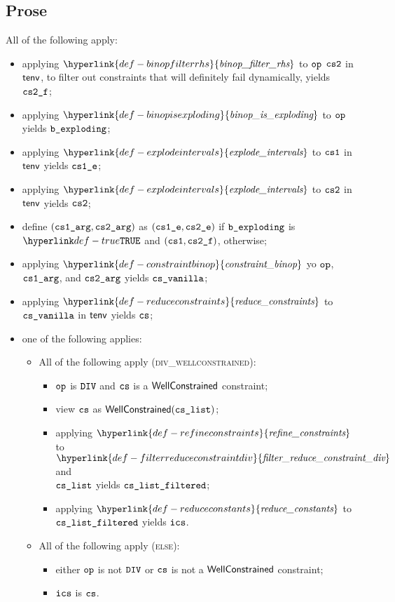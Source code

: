 \documentclass{book}
\newcommand\constraintbinop[0]{\hyperlink{def-constraintbinop}{\textfunc{constraint\_binop}}}
\newcommand\explodeintervals[0]{\hyperlink{def-explodeintervals}{\textfunc{explode\_intervals}}}
\newcommand\binopisexploding[0]{\hyperlink{def-binopisexploding}{\textfunc{binop\_is\_exploding}}}
\newcommand\binopfilterrhs[0]{\hyperlink{def-binopfilterrhs}{\textfunc{binop\_filter\_rhs}}}
\newcommand\refineconstraints[0]{\hyperlink{def-refineconstraints}{\textfunc{refine\_constraints}}}
\newcommand\filterreduceconstraintdiv[0]{\hyperlink{def-filterreduceconstraintdiv}{\textfunc{filter\_reduce\_constraint\_div}}}
\newcommand\reduceconstants[0]{\hyperlink{def-reduceconstants}{\textfunc{reduce\_constants}}}
\newcommand\reduceconstraints[0]{\hyperlink{def-reduceconstraints}{\textfunc{reduce\_constraints}}}
\begin{document}
\subsection{Prose}
All of the following apply:
\begin{itemize}
  \item applying $\binopfilterrhs$ to $\texttt{op}$ $\texttt{cs2}$ in $\textsf{tenv}$, to filter out constraints that will definitely fail dynamically, yields $\texttt{cs2\_f}$;
  \item applying $\binopisexploding$ to $\texttt{op}$ yields $\texttt{b\_exploding}$;
  \item applying $\explodeintervals$ to $\texttt{cs1}$ in $\textsf{tenv}$ yields $\texttt{cs1\_e}$;
  \item applying $\explodeintervals$ to $\texttt{cs2}$ in $\textsf{tenv}$ yields $\texttt{cs2}$;
  \item define $(\texttt{cs1\_arg}, \texttt{cs2\_arg})$ as $(\texttt{cs1\_e}, \texttt{cs2\_e})$ if $\texttt{b\_exploding}$ is $\True$ and $(\texttt{cs1}, \texttt{cs2\_f})$, otherwise;
  \item applying $\constraintbinop$ yo $\texttt{op}$, $\texttt{cs1\_arg}$, and $\texttt{cs2\_arg}$ yields $\texttt{cs\_vanilla}$;
  \item applying $\reduceconstraints$ to $\texttt{cs\_vanilla}$ in $\textsf{tenv}$ yields $\texttt{cs}$;
  \item one of the following applies:
  \begin{itemize}
    \item All of the following apply (\textsc{div\_wellconstrained}):
    \begin{itemize}
      \item $\texttt{op}$ is $\texttt{DIV}$ and $\texttt{cs}$ is a $\textsf{WellConstrained}$ constraint;
      \item view $\texttt{cs}$ as $\textsf{WellConstrained}(\texttt{cs\_list})$;
      \item applying $\refineconstraints$ to $\filterreduceconstraintdiv$ and \\
            $\texttt{cs\_list}$ yields $\texttt{cs\_list\_filtered}$;
      \item applying $\reduceconstants$ to $\texttt{cs\_list\_filtered}$ yields $\texttt{ics}$.
    \end{itemize}

    \item All of the following apply (\textsc{else}):
    \begin{itemize}
      \item either $\texttt{op}$ is not $\texttt{DIV}$ or $\texttt{cs}$ is not a $\textsf{WellConstrained}$ constraint;
      \item $\texttt{ics}$ is $\texttt{cs}$.
    \end{itemize}
  \end{itemize}
\end{itemize}
\end{document}
